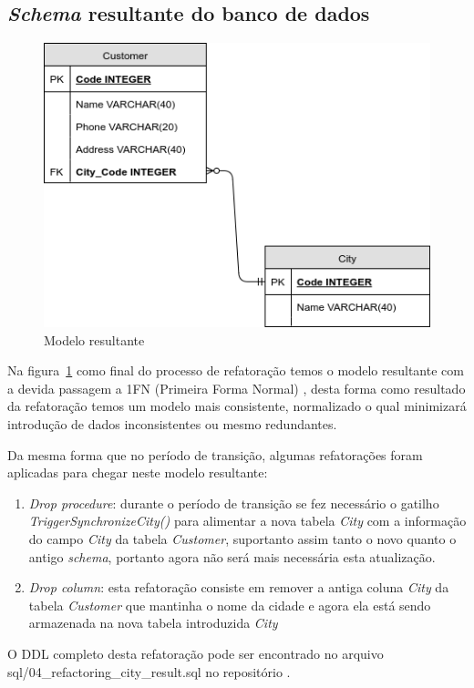 \documentclass[10pt]{article}
\begin{document}
\subsection{\textit{Schema} resultante do banco de dados}

	\begin{figure}[ht]
		\centering
		\includegraphics[width=.45\textwidth]{img/databaseRefactoring-resultModel.png}
		\caption{Modelo resultante}
		\label{figura:7}
	\end{figure}

    Na figura~\ref{figura:7} como final do processo de refatoração temos o modelo resultante com a devida passagem a 1FN (Primeira Forma Normal) \cite{Heuser:ProjetoBD}, desta forma como resultado da refatoração temos um modelo mais consistente, normalizado o qual minimizará introdução de dados inconsistentes ou mesmo redundantes.

    Da mesma forma que no período de transição, algumas refatorações foram aplicadas para chegar neste modelo resultante:

    \begin{enumerate}
        \item \textit{Drop procedure}: durante o período de transição se fez necessário o gatilho \textit{TriggerSynchronizeCity()} para alimentar a nova tabela \textit{City} com a informação do campo \textit{City} da tabela \textit{Customer}, suportanto assim tanto o novo quanto o antigo \textit{schema}, portanto agora não será mais necessária esta atualização.
        \item \textit{Drop column}: esta refatoração consiste em remover a antiga coluna \textit{City} da tabela \textit{Customer} que mantinha o nome da cidade e agora ela está sendo armazenada na nova tabela introduzida \textit{City}
    \end{enumerate}
    
    O DDL completo desta refatoração pode ser encontrado no arquivo sql/04\_refactoring\_city\_result.sql no repositório \cite{Mello:DatabaseRefactoringRepository}.
\end{document}
